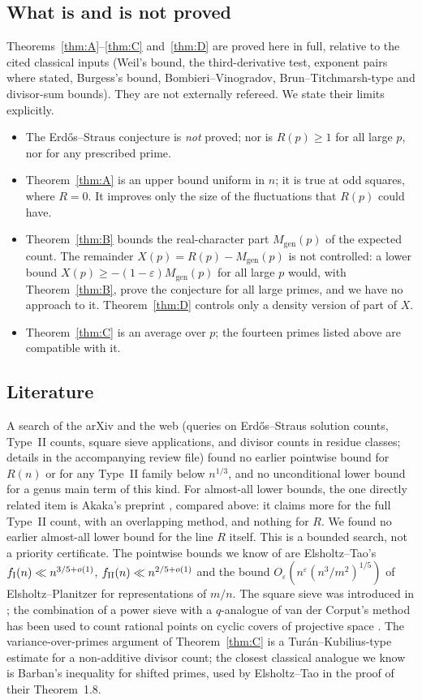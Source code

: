 \documentclass[11pt,reqno]{amsart}
\theoremstyle{definition}
\newcommand{\eps}{\varepsilon}
\newcommand{\Mgen}{M_{\mathrm{gen}}}
\begin{document}
\subsection{What is and is not proved}
Theorems~\ref{thm:A}--\ref{thm:C} and~\ref{thm:D} are proved here in full, relative to the cited
classical inputs (Weil's bound, the third-derivative test, exponent
pairs where stated, Burgess's bound, Bombieri--Vinogradov,
Brun--Titchmarsh-type and divisor-sum bounds).  They are not externally
refereed.  We state their limits explicitly.
\begin{itemize}
\item The Erd\H{o}s--Straus conjecture is \emph{not} proved; nor is
$R(p)\ge1$ for all large $p$, nor for any prescribed prime.
\item Theorem~\ref{thm:A} is an upper bound uniform in $n$; it is true
at odd squares, where $R=0$.  It improves only the size of the
fluctuations that $R(p)$ could have.
\item Theorem~\ref{thm:B} bounds the real-character part $\Mgen(p)$ of
the expected count.  The remainder $X(p)=R(p)-\Mgen(p)$ is not
controlled: a lower bound $X(p)\ge-(1-\eps)\Mgen(p)$ for all large $p$
would, with Theorem~\ref{thm:B}, prove the conjecture for all large
primes, and we have no approach to it.  Theorem~\ref{thm:D} controls
only a density version of part of $X$.
\item Theorem~\ref{thm:C} is an average over $p$; the fourteen primes
listed above are compatible with it.
\end{itemize}

\subsection{Literature}
A search of the arXiv and the web (queries on Erd\H{o}s--Straus
solution counts, Type~II counts, square sieve applications, and
divisor counts in residue classes; details in the accompanying review
file) found no earlier pointwise bound for $R(n)$ or for any Type~II
family below $n^{1/3}$, and no unconditional lower bound for a genus
main term of this kind.  For almost-all lower bounds, the one directly
related item is Akaka's preprint \cite{Akaka}, compared above: it claims
more for the full Type~II count, with an overlapping method, and nothing
for $R$.  We found no earlier almost-all lower bound for the line $R$
itself.  This is a bounded search, not a priority certificate.  The pointwise bounds we
know of are Elsholtz--Tao's $f_{\rm I}(n)\ll n^{3/5+o(1)}$,
$f_{\rm II}(n)\ll n^{2/5+o(1)}$ \cite[Prop.~1.7]{ET} and the bound
$O_\eps(n^\eps (n^3/m^2)^{1/5})$ of Elsholtz--Planitzer \cite[Thm.~1]{EP}
for representations of $m/n$.  The square sieve was introduced in
\cite{HB84}; the combination of a power sieve with a $q$-analogue of van der
Corput's method has been used to count rational points on cyclic covers
of projective space \cite{HBP}.  The variance-over-primes argument of Theorem~\ref{thm:C} is
a Tur\'an--Kubilius-type estimate for a non-additive divisor count; the
closest classical analogue we know is Barban's inequality for shifted
primes, used by Elsholtz--Tao in the proof of their Theorem~1.8.
\end{document}
